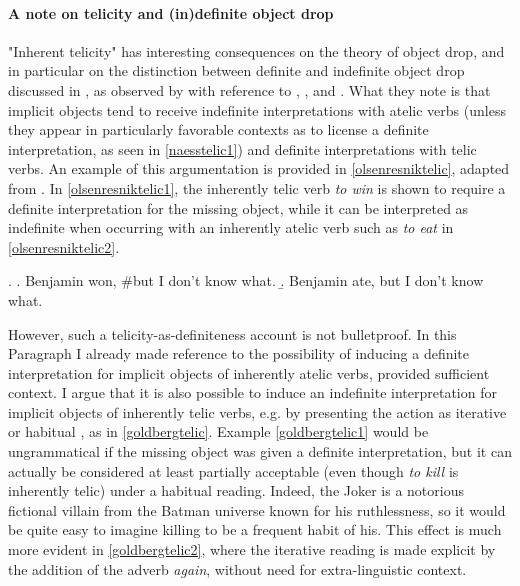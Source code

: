 \paragraph{A note on telicity and (in)definite object drop} "Inherent telicity" has interesting consequences on the theory of object drop, and in particular on the distinction between definite and indefinite object drop discussed in , as observed by \textcite[3-4]{OlsenResnik1997} with reference to \textcite{Allerton1975}, \textcite{Mittwoch1982}, and \textcite{Olsen1997}. What they note is that implicit objects tend to receive indefinite interpretations with atelic verbs (unless they appear in particularly favorable contexts as to license a definite interpretation, as seen in \ref{naesstelic1}) and definite interpretations with telic verbs. An example of this argumentation is provided in \ref{olsenresniktelic}, adapted from \textcite[3]{OlsenResnik1997}. In \ref{olsenresniktelic1}, the inherently telic verb \textit{to win} is shown to require a definite interpretation for the missing object, while it can be interpreted as indefinite when occurring with an inherently atelic verb such as \textit{to eat} in \ref{olsenresniktelic2}.

\ex. \label{olsenresniktelic} \a. \label{olsenresniktelic1} Benjamin won, \#but I don't know what. 
\b. \label{olsenresniktelic2} Benjamin ate, but I don't know what. 

However, such a telicity-as-definiteness account is not bulletproof. In this Paragraph I already made reference to the possibility of inducing a definite interpretation for implicit objects of inherently atelic verbs, provided sufficient context. I argue that it is also possible to induce an indefinite interpretation for implicit objects of inherently telic verbs, e.g. by presenting the action as iterative or habitual \parencite[507-509]{Goldberg2001}, as in \ref{goldbergtelic}. Example \ref{goldbergtelic1} would be ungrammatical if the missing object was given a definite interpretation, but it can actually be considered at least partially acceptable (even though \textit{to kill} is inherently telic) under a habitual reading. Indeed, the Joker is a notorious fictional villain from the Batman universe known for his ruthlessness, so it would be quite easy to imagine killing to be a frequent habit of his. This effect is much more evident in \ref{goldbergtelic2}, where the iterative reading is made explicit by the addition of the adverb \textit{again}, without need for extra-linguistic context.

